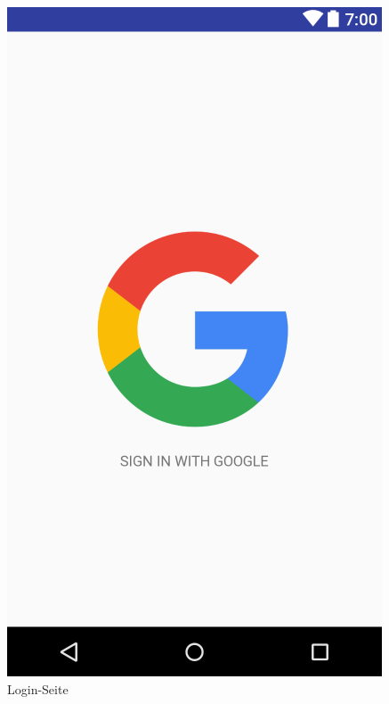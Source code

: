 \documentclass[parskip=full]{scrartcl}
\begin{document}
\begin{figure}[H]
  \vspace{1cm}
  \centering
  \begin{minipage}[b]{0.4\textwidth}
    \includegraphics[width=\textwidth]{GUI/AndroidStudio/login_simple.PNG}
	\caption{Login-Seite}	\label{login} 
  \end{minipage}
  \hfill
  \begin{minipage}[b]{0.4\textwidth}

\end{minipage}
\end{figure}
\end{document}
